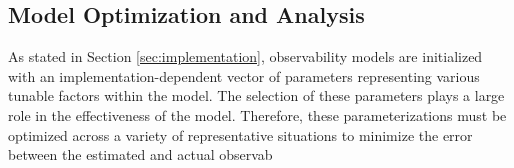 \subsection{Model Optimization and Analysis}

As stated in Section \ref{sec:implementation}, observability models are initialized with an implementation-dependent vector of parameters representing various tunable factors within the model. The selection of these parameters plays a large role in the effectiveness of the model. Therefore, these parameterizations must be optimized across a variety of representative situations to minimize the error between the estimated and actual observab 

\subsubsection{}